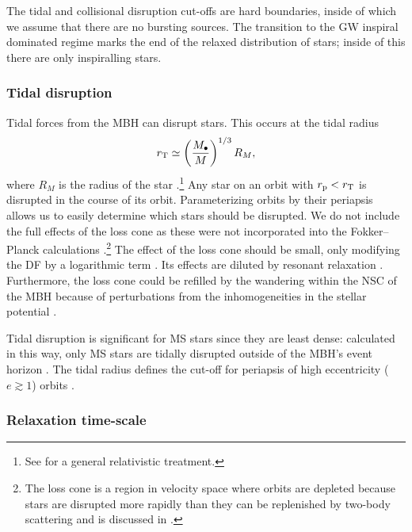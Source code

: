 The tidal and collisional disruption cut-offs are hard boundaries, inside of which we assume that there are no bursting sources. The transition to the GW inspiral dominated regime marks the end of the relaxed distribution of stars; inside of this there are only inspiralling stars.

\subsubsection{Tidal disruption}\label{sec:Tidal}

Tidal forces from the MBH can disrupt stars. This occurs at the tidal radius
\begin{equation}
r_\mathrm{T} \simeq \left(\dfrac{M_\bullet}{M}\right)^{1/3}R_M,
\label{eq:Tidal}
\end{equation}
where $R_M$ is the radius of the star \citep{Hills1975, Rees1988, Kobayashi2004}.\footnote{See \citet{Kesden2012} for a general relativistic treatment.} Any star on an orbit with $r_\mathrm{p} < r_\mathrm{T}$ is disrupted in the course of its orbit. Parameterizing orbits by their periapsis allows us to easily determine which stars should be disrupted. We do not include the full effects of the loss cone \citep{Frank1976, Lightman1977, Cohn1978} as these were not incorporated into the Fokker--Planck calculations \citep{Hopman2009}.\footnote{The loss cone is a region in velocity space where orbits are depleted because stars are disrupted more rapidly than they can be replenished by two-body scattering and is discussed in .} The effect of the loss cone should be small, only modifying the DF by a logarithmic term \citep{Lightman1977, Bahcall1977, Cohn1978}. Its effects are diluted by resonant relaxation \citep{Hopman2007,Toonen2009,Merritt2011}. Furthermore, the loss cone could be refilled by the wandering within the NSC of the MBH because of perturbations from the inhomogeneities in the stellar potential \citep{Sigurdsson1997,Chatterjee2002,Merritt2007}.

Tidal disruption is significant for MS stars since they are least dense: calculated in this way, only MS stars are tidally disrupted outside of the MBH's event horizon \citep{Sigurdsson1997}. The tidal radius defines the cut-off for periapsis of high eccentricity ($e \gtrsim 1$) orbits \citep{Lightman1977}.

\subsubsection{Relaxation time-scale}\label{sec:Relax}

